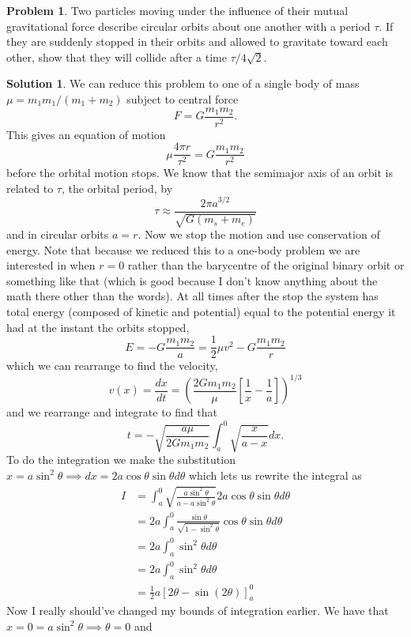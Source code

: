 \documentclass[10pt]{article}
\theoremstyle{definition}
\newtheorem{problem}{Problem}
\newtheorem{soln}{Solution}
\begin{document}
\begin{problem}
Two particles moving under the influence of their mutual gravitational force describe
circular orbits about one another with a period $\tau$. If they are suddenly stopped in their
orbits and allowed to gravitate toward each other, show that they will collide after a time
$\tau/4\sqrt{2}$.
\end{problem}
\begin{soln}
  We can reduce this problem to one of a single body of mass $\mu=m_1m_1/(m_1+m_2)$ subject to central force
  $$F=G\frac{m_1m_2}{r^2}.$$
  This gives an equation of motion
  $$\mu \frac{4\pi r}{\tau^2} =G\frac{m_1m_2}{r^2}$$
  before the orbital motion stops. We know that the semimajor axis of an orbit is related to $\tau$, the orbital period, by
  $$\tau \approx \frac{2\pi a^{3/2}}{\sqrt{G(m_s+m_e)}}$$
  and in circular orbits $a=r$. Now we stop the motion and use conservation of energy. Note that because we reduced this to a one-body problem
  we are interested in when $r=0$ rather than the barycentre of the original binary orbit or something like that (which is good because I don't know anything
  about the math there other than the words). At all times after the stop the system has total energy (composed of kinetic and potential) equal to the potential
  energy it had at the instant the orbits stopped,
  $$E=-G\frac{m_1m_2}{a}=\frac{1}{2}\mu v^2-G\frac{m_1m_2}{r}$$
  which we can rearrange to find the velocity,
  $$v(x)=\frac{dx}{dt}=\left(\frac{2Gm_1m_2}{\mu}\left[\frac{1}{x}-\frac{1}{a}\right]\right)^{1/3}$$
  and we rearrange and integrate to find that
  $$t=-\sqrt{\frac{a\mu}{2Gm_1m_2}}\int_a^0\sqrt{\frac{x}{a-x}}dx.$$
  To do the integration we make the substitution $x=a\sin^2\theta\implies dx=2a\cos\theta\sin\theta d\theta$
  which lets us rewrite the integral as
  \begin{align*}
    I & =\int_a^0\sqrt{\frac{a\sin^2\theta}{a-a\sin^2\theta}}2a\cos\theta\sin\theta d\theta \\
      & =2a\int_a^0\frac{\sin\theta}{\sqrt{1-\sin^2\theta}}\cos\theta\sin\theta d\theta     \\
      & =2a\int_a^0\sin^2\theta d\theta                                                     \\
      & =2a\int_a^0\sin^2\theta d\theta                                                     \\
      & =\frac{1}{2}a\left[2\theta-\sin(2\theta)\right]_a^0
  \end{align*}
  Now I really should've changed my bounds of integration earlier. We have that $x=0=a\sin^2\theta\implies \theta=0$ and

\end{soln}
\end{document}
